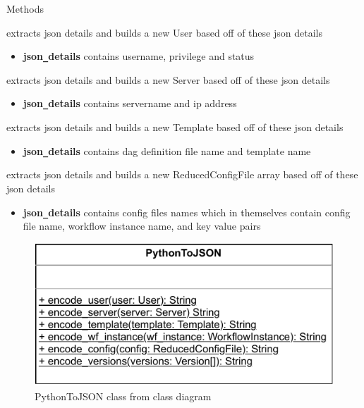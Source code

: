 \begin{methodenv}{Methods}

extracts json details and builds a new User based off of these json details
\begin{itemize}
        \item \textbf{json\texttt{\_}details}
        contains username, privilege and status
\end{itemize}

extracts json details and builds a new Server based off of these json details
\begin{itemize}
        \item \textbf{json\texttt{\_}details}
        contains servername  and ip address
\end{itemize}

extracts json details and builds a new Template based off of these json details
\begin{itemize}
        \item \textbf{json\texttt{\_}details}
        contains dag definition file name and template name
\end{itemize}

extracts json details and builds a new ReducedConfigFile array based off of these json details
\begin{itemize}
        \item \textbf{json\texttt{\_}details}
        contains config files names which in themselves contain config file name, workflow instance name,
        and key value pairs
\end{itemize}

\end{methodenv}


\begin{figure}[h]
        \centerline{\includegraphics[scale=1]{res/Klassen/PythonToJson.pdf}}
        \caption{PythonToJSON class from class diagram}
\end{figure}


